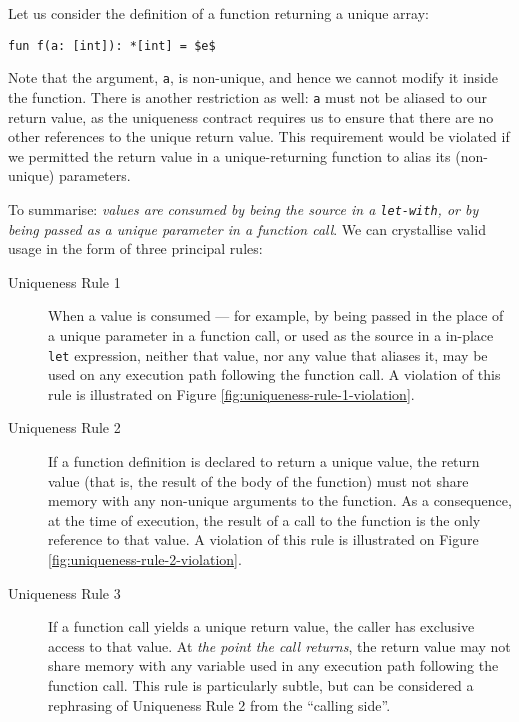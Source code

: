\documentclass[oneside,11pt]{book}
\begin{document}
Let us consider the definition of a function returning a unique array:

\begin{lstlisting}[mathescape=true]
fun f(a: [int]): *[int] = $e$
\end{lstlisting}

Note that the argument, \texttt{a}, is non-unique, and hence we cannot
modify it inside the function.  There is another restriction as well:
\texttt{a} must not be aliased to our return value, as the uniqueness
contract requires us to ensure that there are no other references to
the unique return value.  This requirement would be violated if we
permitted the return value in a unique-returning function to alias its
(non-unique) parameters.

To summarise: \textit{values are consumed by being the source in a
  \texttt{let-with}, or by being passed as a \textit{unique} parameter
  in a function call}.  We can crystallise valid usage in the form of
three principal rules:

\begin{description}
\item[Uniqueness Rule 1] When a value is consumed --- for example, by
  being passed in the place of a unique parameter in a function call,
  or used as the source in a in-place \texttt{let} expression, neither
  that value, nor any value that aliases it, may be used on any
  execution path following the function call.  A violation of this
  rule is illustrated on Figure \ref{fig:uniqueness-rule-1-violation}.

\item[Uniqueness Rule 2] If a function definition is declared to
  return a unique value, the return value (that is, the result of the
  body of the function) must not share memory with any non-unique
  arguments to the function.  As a consequence, at the time of
  execution, the result of a call to the function is the only
  reference to that value.  A violation of this rule is illustrated on
  Figure \ref{fig:uniqueness-rule-2-violation}.

\item[Uniqueness Rule 3] If a function call yields a unique return
  value, the caller has exclusive access to that value.  At
  \textit{the point the call returns}, the return value may not share
  memory with any variable used in any execution path following the
  function call.  This rule is particularly subtle, but can be
  considered a rephrasing of Uniqueness Rule 2 from the ``calling
  side''.
\end{description}
\end{document}
